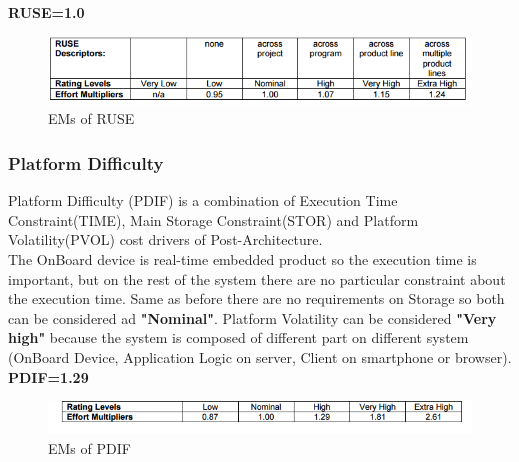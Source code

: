 			\textbf{RUSE=1.0}
			
		\begin{figure}[H] 
			\centering
			\includegraphics[scale = 0.6]{img/RUSE.png}
			\caption{EMs of RUSE}
		\end{figure}

\subsubsection{Platform Difficulty}		
Platform Difficulty (PDIF) is a combination of Execution Time Constraint(TIME), Main Storage Constraint(STOR) and Platform Volatility(PVOL) cost drivers of Post-Architecture. 
		\\
		The OnBoard device is real-time embedded product so the execution time is important, but on the rest of the system there are no particular constraint about the execution time. Same as before there are no requirements on Storage so both can be considered ad \textbf{"Nominal"}.
		Platform Volatility can be considered \textbf{"Very high"} because the system is composed of different part on different system (OnBoard Device, Application Logic on server, Client on smartphone or browser).
		\\
		\textbf{PDIF=1.29}
		
		\begin{figure}[H] 
			\centering
			\includegraphics[scale = 0.6]{img/PDIF.png}
			\caption{EMs of PDIF}
		\end{figure}
	
